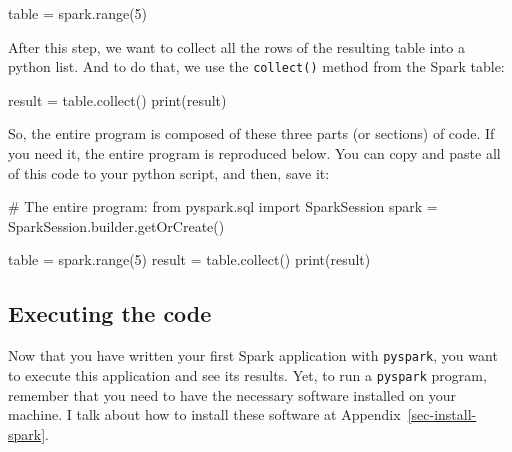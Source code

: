 \documentclass[
  11pt,
  letterpaper,
  DIV=11,
  numbers=noendperiod]{scrreprt}
\newenvironment{Shaded}{\begin{snugshade}}{\end{snugshade}}
\newcommand{\BuiltInTok}[1]{\textcolor[rgb]{0.00,0.23,0.31}{#1}}
\newcommand{\CommentTok}[1]{\textcolor[rgb]{0.37,0.37,0.37}{#1}}
\newcommand{\DecValTok}[1]{\textcolor[rgb]{0.68,0.00,0.00}{#1}}
\newcommand{\ImportTok}[1]{\textcolor[rgb]{0.00,0.46,0.62}{#1}}
\newcommand{\NormalTok}[1]{\textcolor[rgb]{0.00,0.23,0.31}{#1}}
\newcommand{\OperatorTok}[1]{\textcolor[rgb]{0.37,0.37,0.37}{#1}}
\begin{document}
\begin{Shaded}
\begin{Highlighting}[]
\NormalTok{table }\OperatorTok{=}\NormalTok{ spark.}\BuiltInTok{range}\NormalTok{(}\DecValTok{5}\NormalTok{)}
\end{Highlighting}
\end{Shaded}

After this step, we want to collect all the rows of the resulting table
into a python list. And to do that, we use the \texttt{collect()} method
from the Spark table:

\begin{Shaded}
\begin{Highlighting}[]
\NormalTok{result }\OperatorTok{=}\NormalTok{ table.collect()}
\BuiltInTok{print}\NormalTok{(result)}
\end{Highlighting}
\end{Shaded}

So, the entire program is composed of these three parts (or sections) of
code. If you need it, the entire program is reproduced below. You can
copy and paste all of this code to your python script, and then, save
it:

\begin{Shaded}
\begin{Highlighting}[]
\CommentTok{\# The entire program:}
\ImportTok{from}\NormalTok{ pyspark.sql }\ImportTok{import}\NormalTok{ SparkSession}
\NormalTok{spark }\OperatorTok{=}\NormalTok{ SparkSession.builder.getOrCreate()}

\NormalTok{table }\OperatorTok{=}\NormalTok{ spark.}\BuiltInTok{range}\NormalTok{(}\DecValTok{5}\NormalTok{)}
\NormalTok{result }\OperatorTok{=}\NormalTok{ table.collect()}
\BuiltInTok{print}\NormalTok{(result)}
\end{Highlighting}
\end{Shaded}

\hypertarget{executing-the-code}{%
\subsection{Executing the code}\label{executing-the-code}}

Now that you have written your first Spark application with
\texttt{pyspark}, you want to execute this application and see its
results. Yet, to run a \texttt{pyspark} program, remember that you need
to have the necessary software installed on your machine. I talk about
how to install these software at Appendix~\ref{sec-install-spark}.
\end{document}
